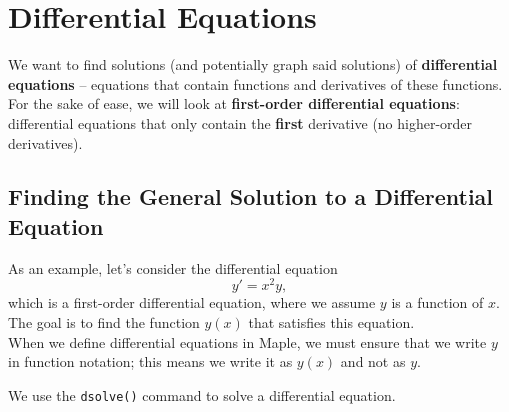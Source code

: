 \chapter{Differential Equations}
\label{chp:differential_equations}						

We want to find solutions (and potentially graph said solutions) of \textbf{differential equations} -- equations that contain functions and derivatives of these functions. For the sake of ease, we will look at \textbf{first-order differential equations}: differential equations that only contain the \textbf{first} derivative (no higher-order derivatives).

\section{Finding the General Solution to a Differential Equation}
\label{sec:finding_general_solution_to_DE}

As an example, let's consider the differential equation $$y'=x^2y,$$ which is a first-order differential equation, where we assume $y$ is a function of $x$. The goal is to find the function $y(x)$ that satisfies this equation. \\

When we define differential equations in Maple, we must ensure that we write $y$ in function notation; this means we write it as $y(x)$ and not as $y$.

\begin{maplegroup}
\begin{mapleinput}
\end{mapleinput}
\mapleresult
\begin{maplelatex}
\end{maplelatex}
\end{maplegroup}

We use the \texttt{dsolve()} command to solve a differential equation.


\begin{maplegroup}
\begin{mapleinput}
\end{mapleinput}
\mapleresult
\begin{maplelatex}
\end{maplelatex}
\end{maplegroup}


